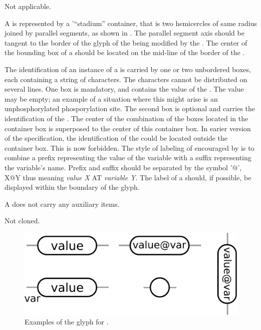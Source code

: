 \begin{glyphDescription}

\glyphSboTerm Not applicable.

\glyphContainer A  is represented by a '``stadium'' container, that is two hemicercles of same radius joined by parallel segments, as shown in .  The parallel segment axis should be tangent to the border of the glyph of the  being modified by the . The center of the bounding box of a  should be located on the mid-line of the border of the .

\glyphLabel The identification of an instance of a  is carried by one or two unbordered boxes, each containing a string of characters.  The characters cannot be distributed on several lines.  One box is mandatory, and contains the value of the .  The value may be empty; an example of a situation where this might arise is an unphosphorylated phosporylation site.  The second box is optional and carries the identification of the . The center of the combination of the boxes located in the container box is superposed to the center of this container box.  In earier version of the \PD specification, the identification of the  could be located outside the  container box.  This is now forbidden.  The style of labeling of  encouraged by \SBGNPDLone is to combine a prefix representing the value of the variable with a suffix representing the variable's name.  Prefix and suffix should be separated by the symbol '@', X@Y thus meaning \emph{value X} AT \emph{variable Y}. The label of a  should, if possible, be displayed within the boundary of the glyph.

\glyphAux A  does not carry any auxiliary items.  

\glyphCloning Not cloned.

\end{glyphDescription}

\begin{figure}[H]
  \centering
  \includegraphics[scale = 0.3, trim = 0 0 0 0.25in]{images/stateVariable}
  \caption{Examples of the \PD glyph for .}
  \label{fig:state-var}
\end{figure}

